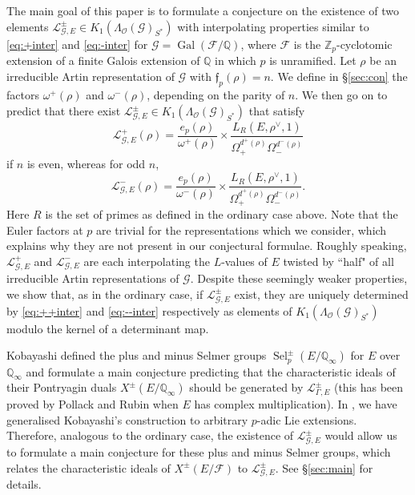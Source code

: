 \documentclass{amsart}
\begin{document}
The main goal of this paper is to formulate a conjecture on the existence of two elements ${\mathcal{L}}_{{\mathcal{G}},E}^\pm\in K_1(\Lambda_{\mathcal{O}}({\mathcal{G}})_{S^*})$ with interpolating properties similar to \eqref{eq:+inter} and \eqref{eq:-inter} for ${\mathcal{G}}=\operatorname{Gal}({\mathcal{F}}/{\mathbb Q})$, where ${\mathcal{F}}$ is the ${{\mathbb Z}_p}$-cyclotomic extension of a finite Galois extension of ${\mathbb Q}$ in which $p$ is unramified. Let $\rho$ be an irreducible Artin representation of ${\mathcal{G}}$ with ${\mathfrak{f}}_p(\rho)=n$. We define in \S\ref{sec:con} the factors $\omega^+(\rho)$ and $\omega^-(\rho)$, depending on the parity of $n$. We then go on to predict that there exist ${\mathcal{L}}_{{\mathcal{G}},E}^\pm\in K_1(\Lambda_{\mathcal{O}}({\mathcal{G}})_{S^*})$ that satisfy
\begin{equation}\label{eq:++inter}
{\mathcal{L}}_{{\mathcal{G}},E}^+(\rho)=\frac{e_p(\rho)}{\omega^+(\rho)}\times\frac{L_R(E,\rho^\vee,1)}{\Omega_+^{d^+(\rho)}\Omega_-^{d^-(\rho)}}
\end{equation}
if $n$ is even, whereas for odd $n$,
\begin{equation}\label{eq:--inter}
{\mathcal{L}}_{{\mathcal{G}},E}^-(\rho)=\frac{e_p(\rho)}{\omega^-(\rho)}\times\frac{L_R(E,\rho^\vee,1)}{\Omega_+^{d^+(\rho)}\Omega_-^{d^-(\rho)}}.
\end{equation}
Here $R$ is the set of primes as defined in the ordinary case above.
Note that the Euler factors at $p$ are trivial for the representations which we consider, which explains why they are not present in our conjectural formulae. Roughly speaking, ${\mathcal{L}}_{{\mathcal{G}},E}^+$ and ${\mathcal{L}}_{{\mathcal{G}},E}^-$ are  each  interpolating the $L$-values of $E$ twisted by  ``half" of all irreducible Artin representations of ${\mathcal{G}}$. Despite these seemingly weaker properties, we show that, as in the ordinary case, if ${\mathcal{L}}_{{\mathcal{G}},E}^\pm$ exist, they are uniquely determined by \eqref{eq:++inter} and \eqref{eq:--inter} respectively as elements of $K_1(\Lambda_{\mathcal{O}}({\mathcal{G}})_{S^*})$ modulo the kernel of a determinant map.

Kobayashi \cite{kobayashi03} defined the plus and minus Selmer groups $\operatorname{Sel}^\pm_p(E/{\mathbb Q}_\infty)$ for $E$ over ${\mathbb Q}_\infty$ and formulate a main conjecture predicting that the characteristic ideals of their Pontryagin duals $X^\pm(E/{\mathbb Q}_\infty)$ should be generated by ${\mathcal{L}}_{\Gamma,E}^\pm$ (this has been proved by Pollack and Rubin \cite{pollackrubin04} when $E$ has complex multiplication). In \cite{leizerbes11}, we have generalised Kobayashi's construction to arbitrary $p$-adic Lie extensions. Therefore, analogous to the ordinary case, the existence of ${\mathcal{L}}_{{\mathcal{G}},E}^\pm$ would allow us to formulate a main conjecture for these plus and minus Selmer groups, which relates the characteristic ideals of $X^\pm(E/{\mathcal{F}})$ to ${\mathcal{L}}_{{\mathcal{G}},E}^\pm$. See \S\ref{sec:main} for details.
\end{document}
